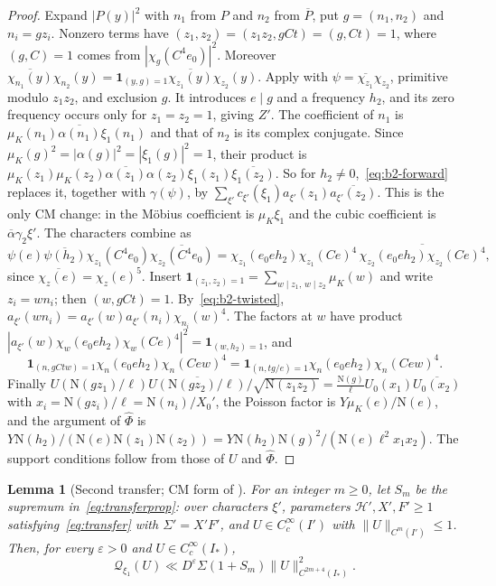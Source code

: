 \documentclass[11pt]{article}
\numberwithin{equation}{section}
\newcommand{\N}{\mathrm N}
\newcommand{\muk}{\mu_K}
\newcommand{\ind}{\mathbf1}
\newtheorem{lemma}{Lemma}
\begin{document}
\begin{proof}
Expand $|P(y)|^2$ with $n_1$ from $P$ and $n_2$ from $\overline P$, put $g=(n_1,n_2)$ and
$n_i=gz_i$. Nonzero terms have $(z_1,z_2)=(z_1z_2,gCt)=(g,Ct)=1$, where $(g,C)=1$ comes from
$|\chi_g(C^4e_0)|^2$. Moreover
$\overline{\chi_{n_1}(y)}\chi_{n_2}(y)=\ind_{(y,g)=1}\overline{\chi_{z_1}(y)}\chi_{z_2}(y)$. Apply
\cite[Lemma~21]{QF} with $\psi=\overline{\chi_{z_1}}\chi_{z_2}$, primitive modulo $z_1z_2$, and
exclusion $g$. It introduces $e\mid g$ and a frequency $h_2$, and its zero frequency occurs only
for $z_1=z_2=1$, giving $Z'$. The coefficient of $n_1$ is $\muk(n_1)\overline{\alpha(n_1)}\xi_1(n_1)$
and that of $n_2$ is its complex conjugate. Since $\muk(g)^2=|\alpha(g)|^2=|\xi_1(g)|^2=1$, their
product is $\muk(z_1)\muk(z_2)\overline{\alpha(z_1)}\alpha(z_2)\xi_1(z_1)\overline{\xi_1(z_2)}$.
So for $h_2\ne0$,~\eqref{eq:b2-forward} replaces it, together with $\gamma(\psi)$, by
$\sum_{\xi'}c_{\xi'}(\xi_1)a_{\xi'}(z_1)\overline{a_{\xi'}(z_2)}$. This is the only CM change: in
\cite[proof of Lemma~7.2]{OAI1112} the M\"obius coefficient is $\muk\xi_1$ and the cubic
coefficient is $\overline\alpha\gamma_2\xi'$. The characters combine as
\begin{equation}\label{eq:d067}
 \psi(e)\overline{\psi(h_2)}\chi_{z_1}(C^4e_0)\overline{\chi_{z_2}(C^4e_0)}
 =\chi_{z_1}(e_0eh_2)\chi_{z_1}(Ce)^4\,\overline{\chi_{z_2}(e_0eh_2)\chi_{z_2}(Ce)^4},
\end{equation}
since $\overline{\chi_z(e)}=\chi_z(e)^5$. Insert $\ind_{(z_1,z_2)=1}=\sum_{w\mid z_1,\,w\mid z_2}\muk(w)$
and write $z_i=wn_i$; then $(w,gCt)=1$. By~\eqref{eq:b2-twisted},
$a_{\xi'}(wn_i)=a_{\xi'}(w)a_{\xi'}(n_i)\chi_{n_i}(w)^4$. The factors at $w$ have product
$|a_{\xi'}(w)\chi_w(e_0eh_2)\chi_w(Ce)^4|^2=\ind_{(w,h_2)=1}$, and
\begin{equation}\label{eq:d068}
 \ind_{(n,gCtw)=1}\chi_n(e_0eh_2)\chi_n(Cew)^4=\ind_{(n,tg/e)=1}\chi_n(e_0eh_2)\chi_n(Cew)^4.
\end{equation}
Finally
$U(\N(gz_1)/\ell)\overline{U(\N(gz_2)/\ell)}/\sqrt{\N(z_1z_2)}
=\frac{\N(g)}\ell U_0(x_1)\overline{U_0(x_2)}$ with $x_i=\N(gz_i)/\ell=\N(n_i)/X_0'$, the Poisson
factor is $Y\muk(e)/\N(e)$, and the argument of $\widehat\Phi$ is
$Y\N(h_2)/(\N(e)\N(z_1)\N(z_2))=Y\N(h_2)\N(g)^2/(\N(e)\ell^2x_1x_2)$. The support conditions follow
from those of $U$ and $\widehat\Phi$.
\end{proof}

\begin{lemma}[Second transfer; CM form of {\cite[Lemma~7.3]{OAI1112}}]\label{lem:b4-second}
For an integer $m\ge0$, let $S_m$ be the supremum in~\eqref{eq:transferprop}: over characters
$\xi'$, parameters $\mathcal H',X',F'\ge1$ satisfying~\eqref{eq:transfer} with $\Sigma'=X'F'$, and
$U\in C_c^\infty(I')$ with $\|U\|_{C^m(I')}\le1$. Then, for every $\varepsilon>0$ and $U\in
C_c^\infty(I_*)$,
\begin{equation}\label{eq:d069}
 \mathcal Q_{\xi_1}(U)\ll D^\varepsilon\Sigma(1+S_m)\|U\|_{C^{2m+4}(I_*)}^2 .
\end{equation}
\end{lemma}
\end{document}
